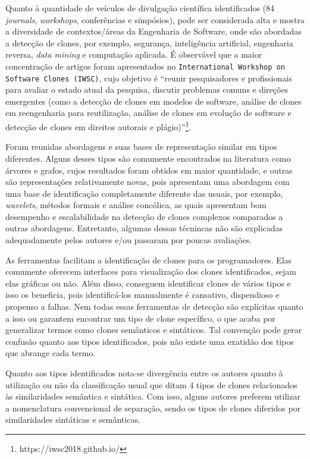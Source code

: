 Quanto à quantidade de veículos de divulgação científica identificados (84 \textit{journals}, \textit{workshops}, conferências e simpósios), pode ser considerada alta e mostra a diversidade de contextos/áreas da Engenharia de Software, onde são abordadas a detecção de clones, por exemplo, segurança, inteligência artificial, engenharia reversa, \textit{data mining} e computação aplicada. É observável que a maior concentração de artigos foram apresentados no \texttt{International Workshop on Software Clones (IWSC)}, cujo objetivo é ``reunir pesquisadores e profissionais para avaliar o estado atual da pesquisa, discutir problemas comuns e direções emergentes (como a detecção de clones em modelos de software, análise de clones em reengenharia para reutilização, análise de clones em evolução de software e detecção de clones em direitos autorais e plágio)''\footnote{https://iwsc2018.github.io/}.

Foram reunidas abordagens e suas bases de representação similar em tipos diferentes. Alguns desses tipos são comumente encontrados na literatura como árvores e grafos, cujos resultados foram obtidos em maior quantidade, e outras são representações relativamente novas, pois apresentam uma abordagem com uma base de identificação completamente diferente das usuais, por exemplo, \textit{wavelets}, métodos formais e análise concólica, as quais apresentam bom desempenho e escalabilidade na detecção de clones complexos comparados a outras abordagens. Entretanto, algumas dessas técnincas não são explicadas adequadamente pelos autores e/ou passaram por poucas avaliações.

As ferramentas facilitam a identificação de clones para os programadores. Elas comumente oferecem interfaces para visualização dos clones identificados, sejam elas gráficas ou não. Além disso, conseguem identificar clones de vários tipos e isso os beneficia, pois identificá-los manualmente é cansativo, dispendioso e propenso a falhas. Nem todas essas ferramentas de detecção são explícitas quanto a isso ou garantem encontrar um tipo de clone específico, o que acaba por generalizar termos como clones semânticos e sintáticos. Tal convenção pode gerar confusão quanto aos tipos identificados, pois não existe uma exatidão dos tipos que abrange cada termo.

Quanto aos tipos identificados nota-se divergência entre os autores quanto à utilização ou não da classificação usual que ditam 4 tipos de clones relacionados às similaridades semântica e sintática. Com isso, alguns autores preferem utilizar a nomenclatura convencional de separação, sendo os tipos de clones diferidos por similaridades sintáticas e semânticas.


